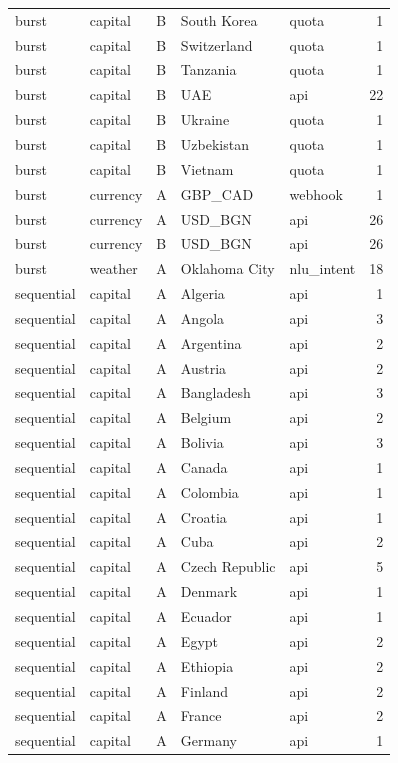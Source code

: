 \begin{tabular}{lllllr}
burst & capital & B & South Korea & quota & 1 \\
burst & capital & B & Switzerland & quota & 1 \\
burst & capital & B & Tanzania & quota & 1 \\
burst & capital & B & UAE & api & 22 \\
burst & capital & B & Ukraine & quota & 1 \\
burst & capital & B & Uzbekistan & quota & 1 \\
burst & capital & B & Vietnam & quota & 1 \\
burst & currency & A & GBP_CAD & webhook & 1 \\
burst & currency & A & USD_BGN & api & 26 \\
burst & currency & B & USD_BGN & api & 26 \\
burst & weather & A & Oklahoma City & nlu_intent & 18 \\
sequential & capital & A & Algeria & api & 1 \\
sequential & capital & A & Angola & api & 3 \\
sequential & capital & A & Argentina & api & 2 \\
sequential & capital & A & Austria & api & 2 \\
sequential & capital & A & Bangladesh & api & 3 \\
sequential & capital & A & Belgium & api & 2 \\
sequential & capital & A & Bolivia & api & 3 \\
sequential & capital & A & Canada & api & 1 \\
sequential & capital & A & Colombia & api & 1 \\
sequential & capital & A & Croatia & api & 1 \\
sequential & capital & A & Cuba & api & 2 \\
sequential & capital & A & Czech Republic & api & 5 \\
sequential & capital & A & Denmark & api & 1 \\
sequential & capital & A & Ecuador & api & 1 \\
sequential & capital & A & Egypt & api & 2 \\
sequential & capital & A & Ethiopia & api & 2 \\
sequential & capital & A & Finland & api & 2 \\
sequential & capital & A & France & api & 2 \\
sequential & capital & A & Germany & api & 1 \\

\end{tabular}
